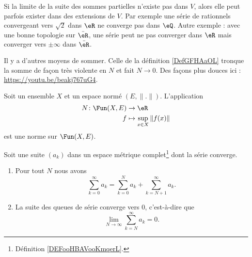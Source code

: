 \begin{remark}
	Si la limite de la suite des sommes partielles n'existe pas dans \( V\), alors elle peut parfois exister dans des extensions de \( V\). Par exemple une série de rationnels convergeant vers \( \sqrt{2}\) dans \( \eR\) ne converge pas dans \( \eQ\). Autre exemple : avec une bonne topologie sur \( \bar \eR\), une série peut ne pas converger dans \( \eR\) mais converger vers \( \pm\infty\) dans \( \bar \eR\).
\end{remark}

\begin{normaltext}
	Il y a d'autres moyens de sommer. Celle de la définition \ref{DefGFHAaOL} tronque la somme de façon très violente en \( N\) et fait \( N\to 0\). Des façons plus douces ici : \url{https://youtu.be/beakj767uG4}.
\end{normaltext}

\begin{definition}	\label{DEFooEYYDooQvZGEx}
	Soit un ensemble \( X\) et un espace normé \( (E,\| . \|)\). L'application
	\begin{equation}
		\begin{aligned}
			N\colon \Fun(X,E) & \to \eR                         \\
			f                 & \mapsto \sup_{x\in X}\| f(x) \|
		\end{aligned}
	\end{equation}
	est une norme sur \( \Fun(X,E)\).
\end{definition}


\begin{lemma}       \label{LEMooHUZEooSyPipb}
	Soit une suite \( (a_k)\) dans un espace métrique complet\footnote{Définition \ref{DEFooHBAVooKmqerL}.} dont la série converge.

	\begin{enumerate}
		\item       \label{ITEMooPFSQooDhKFGL}
		      Pour tout \( N\) nous avons
		      \begin{equation}
			      \sum_{k=0}^{\infty}a_k=\sum_{k=0}^Na_k+\sum_{k=N+1}^{\infty}a_k.
		      \end{equation}
		\item       \label{ITEMooQNHMooUPjupB}
		      La suite des queues de série converge vers \( 0\), c'est-à-dire que
		      \begin{equation}
			      \lim_{N\to \infty} \sum_{k=N}^{\infty}a_k=0.
		      \end{equation}
	\end{enumerate}
\end{lemma}

